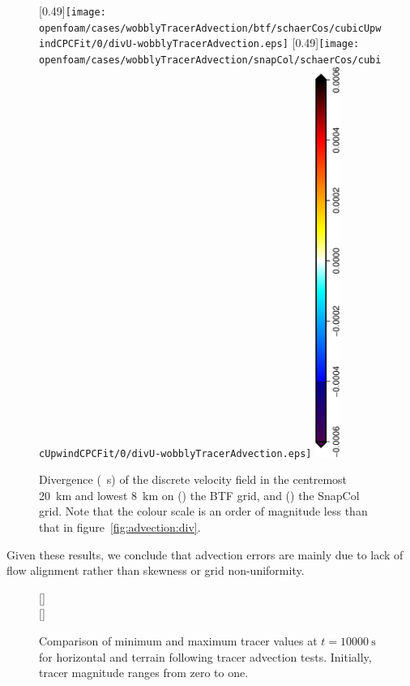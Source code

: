 \begin{figure}
	\captionsetup[subfigure]{position=b}
	\centering
%
	[0.49\textwidth]{\texttt{[image: openfoam/cases/wobblyTracerAdvection/btf/schaerCos/cubicUpwindCPCFit/0/divU-wobblyTracerAdvection.eps]}}
	\hfill
	[0.49\textwidth]{\texttt{[image: openfoam/cases/wobblyTracerAdvection/snapCol/schaerCos/cubicUpwindCPCFit/0/divU-wobblyTracerAdvection.eps]}}
%
	\includegraphics[height=5in,angle=270]{legends/divU-wobblyTracerAdvection_divU.eps}
%
	\caption{Divergence (\si{\per\second}) of the discrete velocity field in the centremost \SI{20}{\kilo\meter} and lowest \SI{8}{\kilo\meter} on () the BTF grid, and () the SnapCol grid.  Note that the colour scale is an order of magnitude less than that in figure~\ref{fig:advection:div}.}
	\label{fig:wobblyTracerAdvection:div}
\end{figure}


Given these results, we conclude that advection errors are mainly due to lack of flow alignment rather than skewness or grid non-uniformity.

\begin{figure}
	\captionsetup[subfigure]{position=b}
	\centering
	[\textwidth]{} \\
	[\textwidth]{}
%
	\caption{Comparison of minimum and maximum tracer values at $t = \SI{10000}{\second}$ for horizontal and terrain following tracer advection tests.  Initially, tracer magnitude ranges from zero to one.}
	\label{fig:wobblyTracerAdvection:ranges}
\end{figure}

